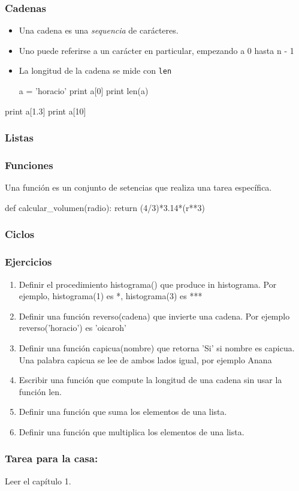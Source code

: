 \begin{frame}[fragile]
    \frametitle{Cadenas}
    \begin{itemize}
        \item Una cadena es una \emph{sequencia} de car\'acteres.
        \item Uno puede referirse a un car\'acter en particular, empezando a 0 hasta n - 1
        \item La longitud de la cadena se mide con \texttt{len}
            \begin{python}
                a = 'horacio'
                print a[0]
                print len(a)
            \end{python}
    \end{itemize}
    \begin{python}
        print a[1.3]
        print a[10]
    \end{python}
\end{frame}


\begin{frame}
    \frametitle{Listas}
\end{frame}


\begin{frame}[fragile]
    \frametitle{Funciones}
    Una funci\'on es un conjunto de setencias que realiza una tarea espec\'ifica.
    \begin{python}
        def calcular_volumen(radio):
            return (4/3)*3.14*(r**3)
    \end{python}
\end{frame}

\begin{frame}
    \frametitle{Ciclos}
\end{frame}


\begin{frame}
    \frametitle{Ejercicios}
    \begin{enumerate}
        \item Definir el procedimiento histograma() que produce in histograma. Por ejemplo, histograma(1) es *, histograma(3) es ***
        \item Definir una funci\'on reverso(cadena) que invierte una cadena. Por ejemplo reverso('horacio') es 'oicaroh'
        \item Definir una funci\'on capicua(nombre) que retorna 'Si' si nombre es capicua. Una palabra capicua se lee de ambos lados igual, por ejemplo Anana
        \item Escribir una funci\'on que compute la longitud de una cadena sin usar la funci\'on len.
        \item Definir una funci\'on que suma los elementos de una lista.
        \item Definir una funci\'on que multiplica los elementos de una lista.
    \end{enumerate}
\end{frame}

\begin{frame}
    \frametitle{Tarea para la casa:}
    Leer el cap\'itulo 1.
\end{frame}
